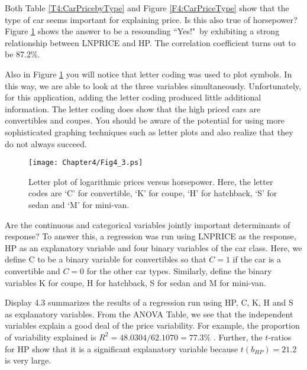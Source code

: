 Both Table \ref{T4:CarPricebyType} and Figure \ref{F4:CarPriceType}
show that the type of car seems important for explaining price. Is
this also true of horsepower? Figure \ref{F4:CarPriceLetter} shows
the answer to be a resounding ``Yes!"\ by exhibiting a strong
relationship between LNPRICE and HP. The correlation coefficient
turns out to be 87.2\%.

Also in Figure \ref{F4:CarPriceLetter} you will notice that letter
coding was used to plot symbols. In this way, we are able to look at
the three variables simultaneously. Unfortunately, for this
application, adding the letter coding produced little additional
information. The letter coding does show that the high priced cars
are convertibles and coupes. You should be aware of the potential
for using more sophisticated graphing techniques such as letter
plots and also realize that they do not always succeed.

\begin{figure}[htp]
  \begin{center}
    \texttt{[image: Chapter4/Fig4\_3.ps]}
    \caption{\label{F4:CarPriceLetter} \small  Letter plot of logarithmic prices versus horsepower. Here, the letter codes
are `C' for convertible, `K' for coupe, `H' for hatchback, `S' for
sedan and `M' for mini-van.}
  \end{center}
\end{figure}


Are the continuous and categorical variables jointly important
determinants of response? To answer this, a regression was run using
LNPRICE as the response, HP as an explanatory variable and four
binary variables of the car class. Here, we define C to be a binary
variable for convertibles so that $C=1$ if the car is a convertible
and $C=0$ for the other car types. Similarly, define the binary
variables K for coupe, H for hatchback, S for sedan and M for
mini-van.

Display 4.3 summarizes the results of a regression run using HP, C,
K, H and S as explanatory variables. From the ANOVA Table, we see
that the independent variables explain a good deal of the price
variability. For
example, the proportion of variability explained is $%
R^{2}=48.0304/62.1070=77.3\%$ . Further, the $t$-ratios for HP show
that it is a significant explanatory variable because
$t(b_{HP})=21.2$ is very large.

